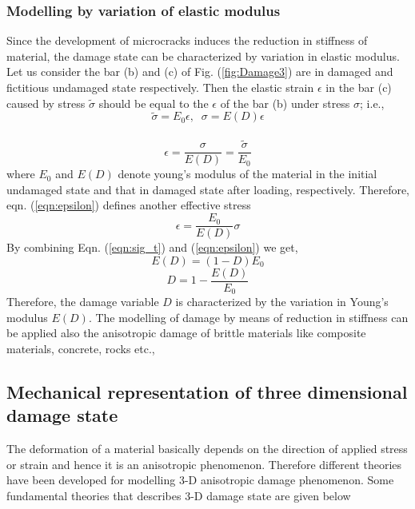 \documentclass[a4paper,12pt]{article}
\begin{document}
\subsubsection{Modelling by variation of elastic modulus} 
\indent\indent\indent Since the development of microcracks induces the reduction in stiffness of material, the damage state can be characterized by variation in elastic modulus. Let us consider the bar (b) and (c) of Fig. (\ref{fig:Damage3}) are in damaged and fictitious undamaged state respectively. Then the elastic strain $\epsilon$ in the bar (c) caused by stress $\tilde{\sigma}$ should be equal to the $\epsilon$ of the bar (b) under stress $\sigma$; i.e.,\\
\begin{equation}
\label{eqn:sig_t2}
   \tilde{\sigma} = E_{0}\epsilon, \;\;  \sigma = E(D)\epsilon 
\end{equation}
\\
\begin{equation}
\label{eqn:epsilon}
\epsilon = \frac{\sigma}{E(D)} = \frac{\tilde{\sigma}}{E_{0}}
\end{equation}
where $E_{0}$ and $E(D)$ denote young's modulus of the material in the initial undamaged state and that in damaged state after loading, respectively. Therefore, eqn. (\ref{eqn:epsilon}) defines another effective stress\\
\begin{equation}
\label{eqn:epsilon2}
\epsilon = \frac{E_{0}}{E(D)}\sigma
\end{equation}
By combining Eqn. (\ref{eqn:sig_t}) and (\ref{eqn:epsilon}) we get,
\begin{equation}
\label{eqn:E(d)}
E(D) = (1 - D) E_{0}
\end{equation}
\begin{equation}
\label{eqn:D2}
D  = 1 - \frac{E(D)}{E_{0}}
\end{equation}
Therefore, the damage variable $D$ is characterized by the variation in Young's modulus $E(D)$. The modelling of damage by means of reduction in stiffness can be applied also the anisotropic damage of brittle materials like composite materials, concrete, rocks etc.,
\subsection{Mechanical representation of three dimensional damage state}
\indent\indent\indent The deformation of a material basically depends on the direction of applied stress or strain and hence it is an anisotropic phenomenon. Therefore different theories have been developed for modelling 3-D anisotropic damage phenomenon. Some fundamental theories that describes 3-D damage state are given below 
\end{document}
